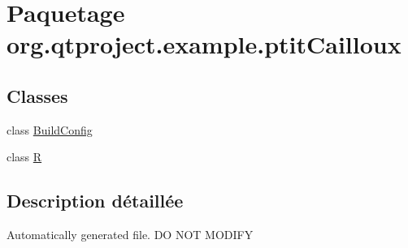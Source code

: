 \hypertarget{namespaceorg_1_1qtproject_1_1example_1_1ptit_cailloux}{\section{Paquetage org.\-qtproject.\-example.\-ptit\-Cailloux}
\label{namespaceorg_1_1qtproject_1_1example_1_1ptit_cailloux}
}
\subsection*{Classes}
\begin{DoxyCompactItemize}
\item 
class \hyperlink{classorg_1_1qtproject_1_1example_1_1ptit_cailloux_1_1_build_config}{Build\-Config}
\item 
class \hyperlink{classorg_1_1qtproject_1_1example_1_1ptit_cailloux_1_1_r}{R}
\end{DoxyCompactItemize}


\subsection{Description détaillée}
Automatically generated file. D\-O N\-O\-T M\-O\-D\-I\-F\-Y 